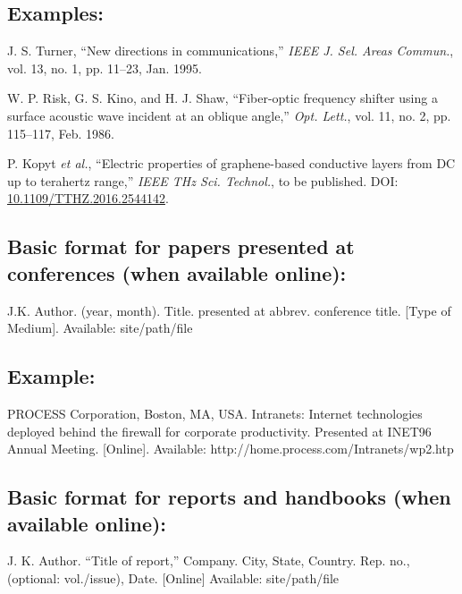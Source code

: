 \documentclass[journal]{IEEEtai}
\begin{document}
\subsection*{Examples:}\vspace*{-12pt}

\begin{thebibliography}{34}
\setcounter{enumiv}{13}

\bibitem{}J. S. Turner, ``New directions in communications,'' {\em IEEE J. Sel. Areas Commun.}, vol. 13, no. 1, pp. 11--23, Jan. 1995. 

\bibitem{} W. P. Risk, G. S. Kino, and H. J. Shaw, ``Fiber-optic frequency shifter using a surface acoustic wave incident at an oblique angle,'' {\em Opt. Lett.}, vol. 11, no. 2, pp. 115--117, Feb. 1986.

\bibitem{} P. Kopyt {\em et al.}, ``Electric properties of graphene-based conductive layers from DC up to terahertz range,'' {\em IEEE THz Sci. Technol.}, to be published. DOI: \href{https://dx.doi.org/10.1109.XXX.123456}{10.1109/TTHZ.2016.2544142}.
\end{thebibliography}

\subsection*{Basic format for papers presented at conferences (when available online):}\vspace*{-12pt}
\begin{thebibliography}{34}
\item[] J.K. Author. (year, month). Title. presented at abbrev. conference title. [Type of Medium]. Available: site/path/file
\end{thebibliography}

\subsection*{Example:}\vspace*{-12pt}

\begin{thebibliography}{34}
\setcounter{enumiv}{16}

\bibitem{}PROCESS Corporation, Boston, MA, USA. Intranets: Internet technologies deployed behind the firewall for corporate productivity. Presented at INET96 Annual Meeting. [Online]. Available: http://home.process.com/Intranets/wp2.htp
\end{thebibliography}

\subsection*{Basic format for reports  and  handbooks (when available online):}\vspace*{-12pt}
\begin{thebibliography}{34}
\item[] J. K. Author. ``Title of report,'' Company. City, State, Country. Rep. no., (optional: vol./issue), Date. [Online] Available: site/path/file 
\end{thebibliography}
\end{document}
